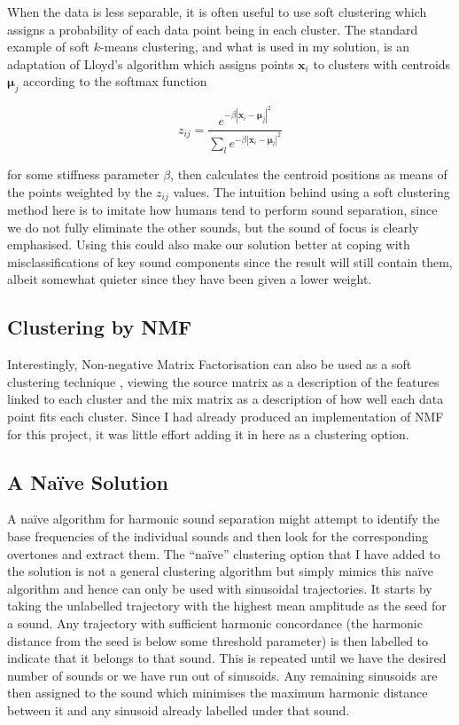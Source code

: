 \documentclass[12pt,a4paper,twoside,openright]{report}
\begin{document}
When the data is less separable, it is often useful to use soft clustering which assigns a probability of each data point being in each cluster. The standard example of soft $ k $-means clustering, and what is used in my solution, is an adaptation of Lloyd's algorithm \cite{mackay2003information} which assigns points $ \mathbf{x}_i $ to clusters with centroids $ \mathbf{\mu}_j $ according to the softmax function

\begin{equation}
z_{ij} = \frac{e^{-\beta \left| \mathbf{x}_i - \mathbf{\mu}_j \right|^2}}{\sum_l e^{-\beta \left| \mathbf{x}_i - \mathbf{\mu}_l \right|^2}}
\end{equation}

for some stiffness parameter $ \beta $, then calculates the centroid positions as means of the points weighted by the $ z_{ij} $ values. The intuition behind using a soft clustering method here is to imitate how humans tend to perform sound separation, since we do not fully eliminate the other sounds, but the sound of focus is clearly emphasised. Using this could also make our solution better at coping with misclassifications of key sound components since the result will still contain them, albeit somewhat quieter since they have been given a lower weight.

\subsection{Clustering by NMF}

Interestingly, Non-negative Matrix Factorisation can also be used as a soft clustering technique \cite{xu2003document}, viewing the source matrix as a description of the features linked to each cluster and the mix matrix as a description of how well each data point fits each cluster. Since I had already produced an implementation of NMF for this project, it was little effort adding it in here as a clustering option.

\subsection{A Na\"{i}ve Solution}

A na\"{i}ve algorithm for harmonic sound separation might attempt to identify the base frequencies of the individual sounds and then look for the corresponding overtones and extract them. The ``na\"{i}ve'' clustering option that I have added to the solution is not a general clustering algorithm but simply mimics this na\"{i}ve algorithm and hence can only be used with sinusoidal trajectories. It starts by taking the unlabelled trajectory with the highest mean amplitude as the seed for a sound. Any trajectory with sufficient harmonic concordance (the harmonic distance from the seed is below some threshold parameter) is then labelled to indicate that it belongs to that sound. This is repeated until we have the desired number of sounds or we have run out of sinusoids. Any remaining sinusoids are then assigned to the sound which minimises the maximum harmonic distance between it and any sinusoid already labelled under that sound.
\end{document}
